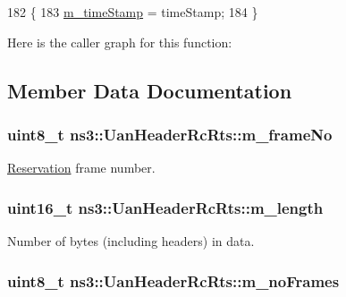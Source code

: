 \begin{DoxyCode}
182 \{
183   \hyperlink{classns3_1_1UanHeaderRcRts_af7cb4639a453a02f98bf46239ae8de6a}{m\_timeStamp} = timeStamp;
184 \}
\end{DoxyCode}


Here is the caller graph for this function\+:




\subsection{Member Data Documentation}
\subsubsection[{\texorpdfstring{m\+\_\+frame\+No}{m_frameNo}}]{\setlength{\rightskip}{0pt plus 5cm}uint8\+\_\+t ns3\+::\+Uan\+Header\+Rc\+Rts\+::m\+\_\+frame\+No\hspace{0.3cm}{\ttfamily [private]}}\hypertarget{classns3_1_1UanHeaderRcRts_ad6ee10b951e81197f4258b85fb5958ee}{}\label{classns3_1_1UanHeaderRcRts_ad6ee10b951e81197f4258b85fb5958ee}


\hyperlink{classns3_1_1Reservation}{Reservation} frame number. 

\subsubsection[{\texorpdfstring{m\+\_\+length}{m_length}}]{\setlength{\rightskip}{0pt plus 5cm}uint16\+\_\+t ns3\+::\+Uan\+Header\+Rc\+Rts\+::m\+\_\+length\hspace{0.3cm}{\ttfamily [private]}}\hypertarget{classns3_1_1UanHeaderRcRts_a036b4592b9361d1db621909351e6c217}{}\label{classns3_1_1UanHeaderRcRts_a036b4592b9361d1db621909351e6c217}


Number of bytes (including headers) in data. 

\subsubsection[{\texorpdfstring{m\+\_\+no\+Frames}{m_noFrames}}]{\setlength{\rightskip}{0pt plus 5cm}uint8\+\_\+t ns3\+::\+Uan\+Header\+Rc\+Rts\+::m\+\_\+no\+Frames\hspace{0.3cm}{\ttfamily [private]}}\hypertarget{classns3_1_1UanHeaderRcRts_a809efa819ec8e806c318b4a051206eea}{}\label{classns3_1_1UanHeaderRcRts_a809efa819ec8e806c318b4a051206eea}


